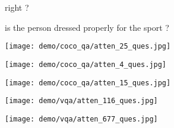 \documentclass{article}
\def \fsize {1pt}
\begin{document}
\begin{figure}[p]
\begin{minipage}{0.19\linewidth}
\begin{center}
{\textcolor[rgb]{0.0000,0.3941,1.0000}{right}
\textcolor[rgb]{0.0000,0.0000,1.0000}{?}
}
\end{center}
\end{minipage}
\begin{minipage}{0.19\linewidth}
\begin{center}
\tiny{
\setlength{\fboxsep}{\fsize}
\textcolor[rgb]{0.0000,0.0000,0.7139}{is}
\textcolor[rgb]{0.0000,0.0000,0.6604}{the}
\textcolor[rgb]{0.0000,0.0000,0.6961}{person}
\textcolor[rgb]{0.1233,1.0000,0.8444}{dressed}
\textcolor[rgb]{0.7179,1.0000,0.2498}{properly}
\textcolor[rgb]{0.3131,1.0000,0.6546}{for}
\textcolor[rgb]{0.0000,0.2373,1.0000}{the}
\textcolor[rgb]{0.5534,1.0000,0.4143}{sport}
\textcolor[rgb]{0.0000,0.0000,0.8565}{?}
}
\end{center}   
\end{minipage}

\begin{minipage}{0.19\linewidth}
\texttt{[image: demo/coco\_qa/atten\_25\_ques.jpg]}
\end{minipage}
\begin{minipage}{0.19\linewidth}
\texttt{[image: demo/coco\_qa/atten\_4\_ques.jpg]}
\end{minipage}
\begin{minipage}{0.19\linewidth}
\texttt{[image: demo/coco\_qa/atten\_15\_ques.jpg]}
\end{minipage}
\begin{minipage}{0.19\linewidth}
\texttt{[image: demo/vqa/atten\_116\_ques.jpg]}
\end{minipage}
\begin{minipage}{0.19\linewidth}
\texttt{[image: demo/vqa/atten\_677\_ques.jpg]}
\end{minipage}


\end{figure}
\end{document}
